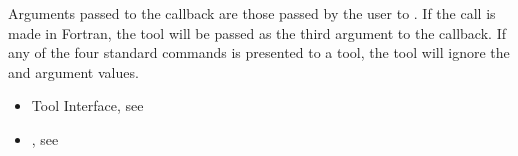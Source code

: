 Arguments passed to the callback are those passed by the user to
. If the call is made in Fortran, the tool
will be passed  as the third argument to the callback. If
any of the four standard commands is presented to a tool, the tool
will ignore the  and  argument values.



\crossreferences
\begin{itemize}
\item Tool Interface, see
\item {}, see
\end{itemize}

